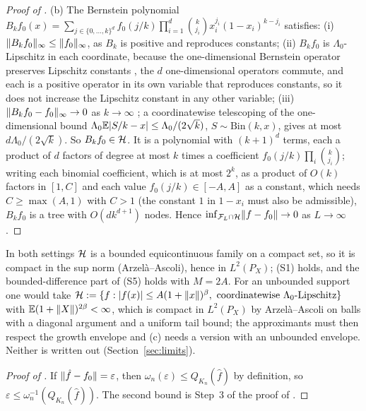 \begin{proof}[Proof of ]
(b) The Bernstein polynomial $B_kf_0(x) = \sum_{j \in \{0, \dots, k\}^d}f_0(j/k)\prod_{i=1}^d\binom{k}{j_i}x_i^{j_i}(1 - x_i)^{k - j_i}$ satisfies: (i) $\lVert B_kf_0\rVert_\infty \le \lVert f_0\rVert_\infty$, as $B_k$ is positive and reproduces constants; (ii) $B_kf_0$ is $\Lambda_0$-Lipschitz in each coordinate, because the one-dimensional Bernstein operator preserves Lipschitz constants \citep{brownelliottpaget1987}, the $d$ one-dimensional operators commute, and each is a positive operator in its own variable that reproduces constants, so it does not increase the Lipschitz constant in any other variable; (iii) $\lVert B_kf_0 - f_0\rVert_\infty \to 0$ as $k \to \infty$ \citep[Ch.~2]{lorentz1953}; a coordinatewise telescoping of the one-dimensional bound $\Lambda_0\mathbb{E}\lvert S/k - x\rvert \le \Lambda_0/(2\sqrt k)$, $S \sim \mathrm{Bin}(k, x)$, gives at most $d\Lambda_0/(2\sqrt k)$. So $B_kf_0 \in \mathcal{H}$. It is a polynomial with $(k + 1)^d$ terms, each a product of $d$ factors of degree at most $k$ times a coefficient $f_0(j/k)\prod_i\binom{k}{j_i}$; writing each binomial coefficient, which is at most $2^k$, as a product of $O(k)$ factors in $[1, C]$ and each value $f_0(j/k) \in [-A, A]$ as a constant, which needs $C \ge \max(A, 1)$ with $C > 1$ (the constant $1$ in $1 - x_i$ must also be admissible), $B_kf_0$ is a tree with $O(dk^{d+1})$ nodes. Hence $\inf_{\mathcal{F}_L \cap \mathcal{H}}\lVert f - f_0\rVert \to 0$ as $L \to \infty$.
\end{proof}

In both settings $\mathcal{H}$ is a bounded equicontinuous family on a compact set, so it is compact in the sup norm (Arzel\`a--Ascoli), hence in $L^2(P_X)$; (S1) holds, and the bounded-difference part of (S5) holds with $M = 2A$. For an unbounded support one would take $\mathcal{H} := \{f : \lvert f(x)\rvert \le A(1 + \lVert x\rVert)^{\beta},\ \text{coordinatewise }\Lambda_0\text{-Lipschitz}\}$ with $\mathbb{E}(1 + \lVert X\rVert)^{2\beta} < \infty$, which is compact in $L^2(P_X)$ by Arzel\`a--Ascoli on balls with a diagonal argument and a uniform tail bound; the approximants must then respect the growth envelope and (c) needs a version with an unbounded envelope. Neither is written out (Section~\ref{sec:limits}).

\begin{proof}[Proof of ]
If $\lVert \hat f - f_0\rVert = \varepsilon$, then $\omega_n(\varepsilon) \le Q_{K_n}(\hat f)$ by definition, so $\varepsilon \le \omega_n^{-1}(Q_{K_n}(\hat f))$. The second bound is Step~3 of the proof of .
\end{proof}
